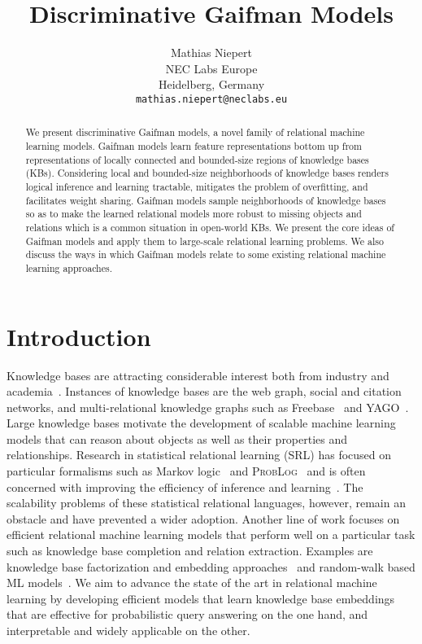 \documentclass{article}
\title{Discriminative Gaifman Models}
\author{
  Mathias Niepert\\
  NEC Labs Europe\\
  Heidelberg, Germany \\
  \texttt{mathias.niepert@neclabs.eu} \\
}
\begin{document}
\maketitle

\begin{abstract}
We present discriminative Gaifman models, a novel family of relational machine learning models. Gaifman models learn feature representations bottom up from representations of locally connected and bounded-size regions of knowledge bases (KBs).  Considering local and bounded-size neighborhoods of knowledge bases renders logical inference and learning tractable, mitigates the problem of overfitting, and facilitates weight sharing. Gaifman models sample neighborhoods of knowledge bases so as to make the learned relational models more robust to missing objects and relations which is a common situation in open-world KBs. We present the core ideas of Gaifman models and apply them to large-scale relational learning problems. We also discuss the ways in which Gaifman models relate to some existing relational machine learning approaches.
\end{abstract}

\section{Introduction}

Knowledge bases are attracting considerable interest both from industry and academia~\cite{Bollacker:2008,carlson:2010,Lao:2011,Gardner:2015}. Instances of knowledge bases are the web graph, social and citation networks, and multi-relational knowledge graphs such as Freebase~\cite{Bollacker:2008} and YAGO~\cite{Hoffart:2013}. Large knowledge bases motivate the development of scalable  machine learning models that can reason about objects as well as their properties and relationships. Research in statistical relational learning (SRL) has focused on particular formalisms such as Markov logic~\cite{richardson:2006} and \textsc{ProbLog}~\cite{dries:2015} and is often concerned with improving the  efficiency of inference and learning~\cite{Kersting:2012,VdB:2013}. The  scalability problems of these statistical relational languages, however, remain an obstacle and have prevented a wider adoption. Another line of work focuses on efficient relational machine learning models that perform well on a particular task such as knowledge base completion and relation extraction. Examples are knowledge base factorization and embedding approaches~\cite{Bordes:2011,nickel:2011,riedel13relation,Socher:2013} and random-walk based ML models~\cite{Lao:2011,Gardner:2015}. 
We aim to advance the state of the art in relational machine learning by developing efficient models that learn knowledge base  embeddings that are effective for probabilistic query answering on the one hand, and interpretable and widely applicable on the other.
\end{document}
